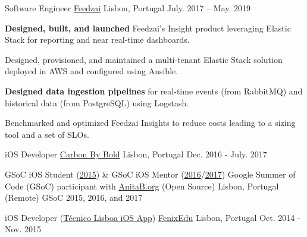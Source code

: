 \begin{cventries}
    
  \cventry
    {Software Engineer}
    {\href{https://feedzai.com/}{Feedzai}}
    {Lisbon, Portugal}
    {July. 2017 – May. 2019}
    {
      \begin{cvitems}
        \item \textbf{Designed, built, and launched} Feedzai's Insight product leveraging Elastic Stack for reporting and near real-time dashboards.
        \item Designed, provisioned, and maintained a multi-tenant Elastic Stack solution deployed in AWS and configured using Ansible.
        \item \textbf{Designed data ingestion pipelines} for real-time events (from RabbitMQ) and historical data (from PostgreSQL) using Logstash.
        \item Benchmarked and optimized Feedzai Insights to reduce costs leading to a sizing tool and a set of SLOs.
      \end{cvitems}
      \vspace{4mm}
    }

  \cventryShort
    {iOS Developer}
    {\href{https://www.carbonbybold.com/pt-pt/}{Carbon By Bold}}
    {Lisbon, Portugal}
    {Dec. 2016 - July. 2017}

  \cventryShort
    {GSoC iOS Student (\href{https://docs.google.com/presentation/d/1yv4XuNNpTgDkyOjL9SSjGe7PSZuwpbah42mQCACxdXQ/}{2015}) \& GSoC iOS Mentor (\href{https://summerofcode.withgoogle.com/archive/2016/projects/5509901874888704/}{2016}/\href{https://summerofcode.withgoogle.com/archive/2017/projects/5508656065937408/}{2017})}
    {Google Summer of Code (GSoC) participant with \href{http://anitaborg.org/}{AnitaB.org} (Open Source)}
    {Lisbon, Portugal (Remote)}
    {GSoC 2015, 2016, and 2017}
    
  \cventryShort
    {iOS Developer (\href{https://apps.apple.com/us/app/tecnico-lisboa/id959976468}{Técnico Lisboa iOS App})}
    {\href{http://fenixedu.org/}{FenixEdu}}
    {Lisbon, Portugal}
    {Oct. 2014 - Nov. 2015}

\end{cventries}
